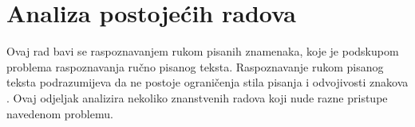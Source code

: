 \section{Analiza postojećih radova}
\label{sec:analiza-postojecih-radova}
Ovaj rad bavi se raspoznavanjem rukom pisanih znamenaka, koje je podskupom problema raspoznavanja ručno pisanog teksta.
Raspoznavanje rukom pisanog teksta podrazumijeva da ne postoje ograničenja stila pisanja i odvojivosti znakova
\citep{mantas1986}. Ovaj odjeljak analizira nekoliko znanstvenih radova koji nude razne pristupe navedenom problemu.
